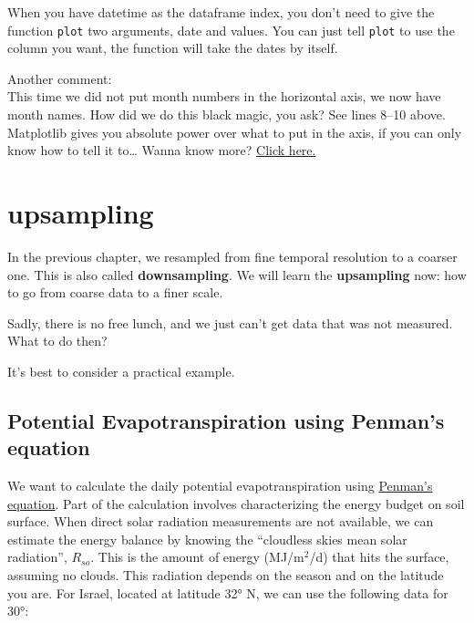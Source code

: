 \documentclass[
  letterpaper,
  DIV=11,
  numbers=noendperiod,
  oneside]{scrreprt}
\begin{document}
When you have datetime as the dataframe index, you don't need to give
the function \texttt{plot} two arguments, date and values. You can just
tell \texttt{plot} to use the column you want, the function will take
the dates by itself.

Another comment:\\
This time we did not put month numbers in the horizontal axis, we now
have month names. How did we do this black magic, you ask? See lines
8--10 above. Matplotlib gives you absolute power over what to put in the
axis, if you can only know how to tell it to\ldots{} Wanna know more?
\href{/best-practices/dates.qmd}{Click here.}

\hypertarget{upsampling}{%
\chapter{upsampling}\label{upsampling}}

In the previous chapter, we resampled from fine temporal resolution to a
coarser one. This is also called \textbf{downsampling}. We will learn
the \textbf{upsampling} now: how to go from coarse data to a finer
scale.

Sadly, there is no free lunch, and we just can't get data that was not
measured. What to do then?

It's best to consider a practical example.

\hypertarget{potential-evapotranspiration-using-penmans-equation}{%
\section{Potential Evapotranspiration using Penman's
equation}\label{potential-evapotranspiration-using-penmans-equation}}

We want to calculate the daily potential evapotranspiration using
\href{http://yairmau.com/surface-hydrology/evapotranspiration/evapotranspiration-lecture.html\#net-radiation}{Penman's
equation}. Part of the calculation involves characterizing the energy
budget on soil surface. When direct solar radiation measurements are not
available, we can estimate the energy balance by knowing the ``cloudless
skies mean solar radiation'', \(R_{so}\). This is the amount of energy
(MJ/m\(^2\)/d) that hits the surface, assuming no clouds. This radiation
depends on the season and on the latitude you are. For Israel, located
at latitude 32° N, we can use the following data for 30°:
\end{document}
